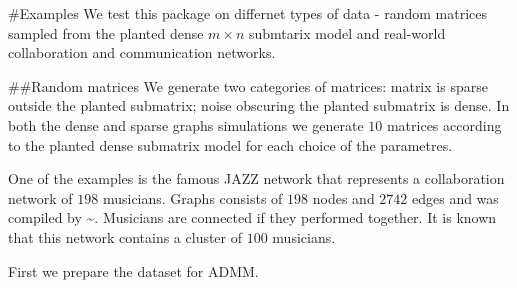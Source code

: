 \documentclass[]{article}
\begin{document}
\#Examples We test this package on differnet types of data - random
matrices sampled from the planted dense \(m \times n\) submtarix model
and real-world collaboration and communication networks.

\#\#Random matrices We generate two categories of matrices: matrix is
sparse outside the planted submatrix; noise obscuring the planted
submatrix is dense. In both the dense and sparse graphs simulations we
generate \(10\) matrices according to the planted dense submatrix model
for each choice of the parametres.

One of the examples is the famous JAZZ network that represents a
collaboration network of \(198\) musicians. Graphs consists of \(198\)
nodes and \(2742\) edges and was compiled by \textasciitilde{}.
Musicians are connected if they performed together. It is known that
this network contains a cluster of \(100\) musicians.

First we prepare the dataset for ADMM.
\end{document}
